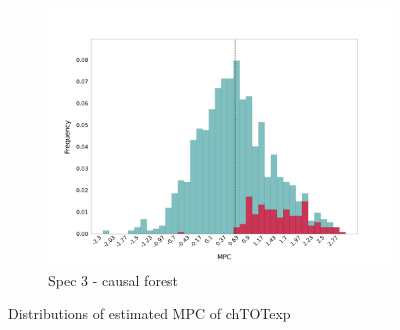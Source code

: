 \begin{figure}[t]
\begin{subfigure}{0.33\linewidth}
        \includegraphics[width=\linewidth]{figures/distributions/spec3_cf_chTOTexp.png}
        \caption{Spec 3 - causal forest}
    \end{subfigure}\hfill
    \caption{Distributions of estimated MPC of chTOTexp}
\end{figure}

